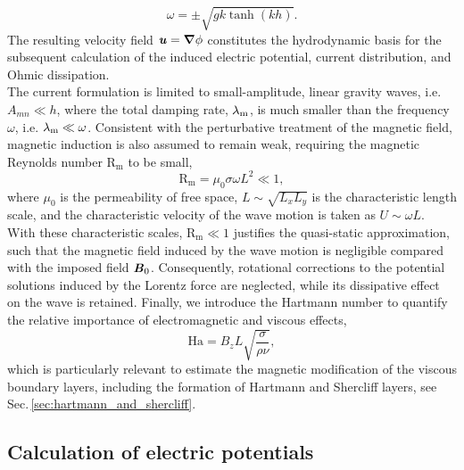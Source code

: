 \documentclass[aps,prfluids,reprint,superscriptaddress]{revtex4-2}
\newcommand{\h}[1]{\textbf{\textit{#1}}}
\newcommand{\ii}[1]{\text{#1}}
\begin{document}
\begin{equation}
	\omega = \pm\sqrt{gk\tanh(kh)}.
	\label{eq:ang_freq}
\end{equation}
The resulting velocity field $\h u=\bm\nabla\phi$ constitutes the hydrodynamic basis for the subsequent calculation of the induced electric potential, current distribution, and Ohmic dissipation.
\\
\indent The current formulation is limited to small-amplitude, linear gravity waves, i.e. $A_{mn} \ll h$, where the total damping rate, $\lambda_{\rm m}$, is much smaller than the frequency $\omega$, i.e. $\lambda_{\rm m}\ll\omega$. Consistent with the perturbative treatment of the magnetic field, magnetic induction is also assumed to remain weak, requiring the magnetic Reynolds number $\mathrm{R_m}$ to be small,
\begin{equation}
	\mathrm{R_m}
	=
	\mu_0\sigma\omega L^2
	\ll 1,
	\label{eq:mag_parameters}
\end{equation}
where $\mu_0$ is the permeability of free space, $L\sim\sqrt{L_x L_y}$ is the characteristic length scale, and the characteristic velocity of the wave motion is taken as $U\sim\omega L$. With these characteristic scales, $\mathrm{R_m}\ll1$ justifies the quasi-static approximation, such that the magnetic field induced by the wave motion is negligible compared with the imposed field $\h B_0$. Consequently, rotational corrections to the potential solutions induced by the Lorentz force are neglected, while its dissipative effect on the wave is retained. Finally, we introduce the Hartmann number to quantify the relative importance of electromagnetic and viscous effects,
\begin{equation}
	\ii{Ha}
	=
	B_z L
	\sqrt{\frac{\sigma}{\rho\nu}},
	\label{eq:hartmann_number}
\end{equation}
which is particularly relevant to estimate the magnetic modification of the viscous boundary layers, including the formation of Hartmann and Shercliff layers, see Sec.\,\ref{sec:hartmann_and_shercliff}.
 


\subsection{Calculation of electric potentials}
\label{sec:elec_potential}
\end{document}
